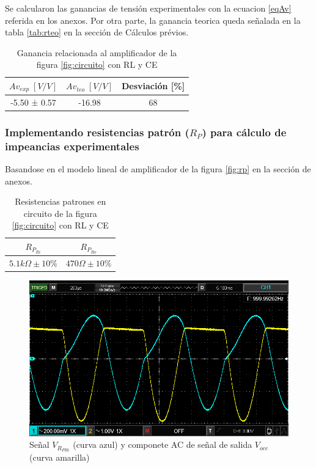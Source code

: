 \documentclass[12pt, a4paper]{article}
\begin{document}
    Se calcularon las ganancias de tensión experimentales con la ecuacion \eqref{eqAv} referida en los anexos. Por otra parte, la ganancia teorica queda señalada en la tabla \ref{tab:rteo} en la sección de Cálculos prévios.

    \begin{table}[h!]
        \centering
        \caption{Ganancia relacionada al amplificador de la figura \ref{fig:circuito} con RL y CE}
        \label{tab:av4}
        \begin{tabular}{|c|c|c|} \hline
            $Av_{exp} \; [V/V]$  &  $Av_{teo} \; [V/V]$  & Desviación [\%] \\ \hline
            -5.50 ± 0.57         &       -16.98          & 68   \\ \hline
        \end{tabular}
    \end{table}

    \subsubsection{Implementando resistencias patrón ($R_P$) para cálculo de impeancias experimentales}

    Basandose en el modelo lineal de amplificador de la figura \ref{fig:rp} en la sección de anexos.

    \begin{table}[h!]
        \centering
        \caption{Resistencias patrones en circuito de la figura \ref{fig:circuito} con RL y CE}
        \label{tab:rp4}
        \begin{tabular}{|c|c|} \hline
            $R_{P_{Ri}}$          &  $R_{P_{Ro}}$  \\ \hline
            $5.1k\Omega \pm 10\%$  &  $470\Omega \pm 10\%$    \\ \hline
        \end{tabular}
    \end{table}

    \newpage

    \begin{figure}[h!]
        \centering
        \includegraphics[height=5cm\textwidth]{RPcRLcCE.png}
        \caption{Señal $V_{R_{PRi}}$ (curva azul) y componete AC de señal de salida $V_{occ}$ (curva amarilla)}
        \label{fig:vrp4}
    \end{figure}
\end{document}

